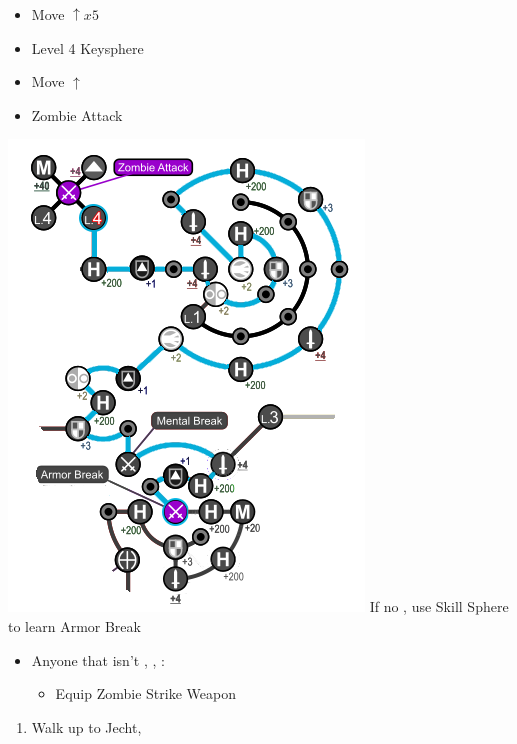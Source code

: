 \begin{spheregrid}
\begin{multicols}{2}
\begin{itemize}
\begin{itemize}
				            \begin{itemize}
					            \item Move $\uparrow x5$
					            \item Level 4 Keysphere
					            \item Move $\uparrow$
					            \item Zombie Attack
				            \end{itemize}
						\includegraphics[width=.9\columnwidth]{graphics/Tidus_BFA}
				            \rikkuf If no \od, use Skill Sphere to learn Armor Break
			      \end{itemize}
		\end{itemize}
	\end{multicols}
\end{spheregrid}
	\begin{equip}
		\begin{itemize}
			\item Anyone that isn't \tidus, \yuna, \auron:
			      \begin{itemize}
				      \item Equip Zombie Strike Weapon
			      \end{itemize}
		\end{itemize}
	\end{equip}
	\begin{enumerate}[resume]
		\item Walk up to Jecht, \cs[4:30]
	\end{enumerate}
	

